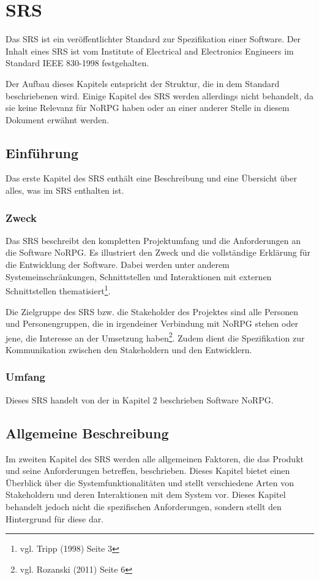 \chapter{\acl{SRS}}
	Das \acf{SRS} ist ein veröffentlichter Standard zur Spezifikation einer Software. Der Inhalt eines \ac{SRS} ist vom Institute of Electrical and Electronics Engineers im Standard IEEE 830-1998 festgehalten.
	
	Der Aufbau dieses Kapitels entspricht der Struktur, die in dem Standard beschriebenen wird. Einige Kapitel des SRS werden allerdings nicht behandelt, da sie keine Relevanz für NoRPG haben oder an einer anderer Stelle in diesem Dokument erwähnt werden.
	
\section{Einführung}
	Das erste Kapitel des \ac{SRS} enthält eine Beschreibung und eine Übersicht über alles, was im \ac{SRS} enthalten ist.
	
	\subsection{Zweck}
		Das \ac{SRS} beschreibt den kompletten Projektumfang und die Anforderungen an die Software NoRPG. Es illustriert den Zweck und die vollständige Erklärung für die Entwicklung der Software. Dabei werden unter anderem Systemeinschränkungen, Schnittstellen und Interaktionen mit externen Schnittstellen thematisiert\footnote{vgl. Tripp \cite{srsIEEE}(1998) Seite 3}. 
	
		Die Zielgruppe des \ac{SRS} bzw. die Stakeholder des Projektes sind alle Personen und Personengruppen, die in irgendeiner Verbindung mit NoRPG stehen oder jene, die Interesse an der Umsetzung haben\footnote{vgl. Rozanski \cite{rozanski2011}(2011) Seite 6}. Zudem dient die Spezifikation zur Kommunikation zwischen den Stakeholdern und den Entwicklern.
		
	\subsection{Umfang}
		Dieses \ac{SRS} handelt von der in Kapitel 2 beschrieben Software NoRPG. 
		
\section{Allgemeine Beschreibung}
	Im zweiten Kapitel des \ac{SRS} werden alle allgemeinen Faktoren, die das Produkt und seine Anforderungen betreffen, beschrieben. Dieses Kapitel bietet einen Überblick über die Systemfunktionalitäten und stellt verschiedene Arten von Stakeholdern und deren Interaktionen mit dem System vor. Dieses Kapitel behandelt jedoch nicht die spezifischen Anforderungen, sondern stellt den Hintergrund für diese dar. 

